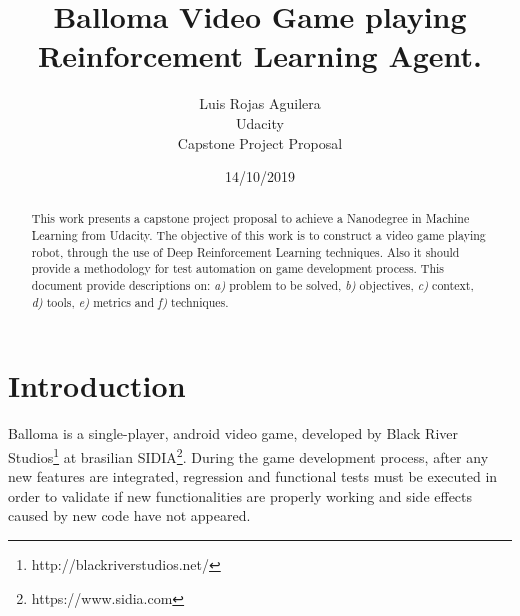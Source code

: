 \documentclass[peerreview,onecolumn]{IEEEtran}
\begin{document}
\title{Balloma Video Game playing Reinforcement Learning Agent.}



\author{Luis Rojas Aguilera \\
Udacity\\
Capstone Project Proposal\\
}
\date{14/10/2019}

\maketitle
\tableofcontents
\listoffigures
\listoftables

\IEEEpeerreviewmaketitle
\begin{abstract}

  This work presents a capstone project proposal to achieve a Nanodegree in Machine Learning from Udacity. The objective of this work is to construct a video game playing robot, through the use of Deep Reinforcement Learning techniques. Also it should provide a methodology for test automation on game development process. This document provide descriptions on: \textit{a)} problem to be solved, \textit{b)} objectives, \textit{c)} context, \textit{d)} tools, \textit{e)} metrics and \textit{f)} techniques.

\end{abstract}


\section{Introduction}
Balloma is a single-player, android video game, developed by Black River Studios\footnote{http://blackriverstudios.net/} at brasilian SIDIA\footnote{https://www.sidia.com}.  During the game development process, after any new features are integrated, regression and functional tests must be executed in order to validate if new functionalities are properly working and side effects caused by new code have not appeared. 
\end{document}
